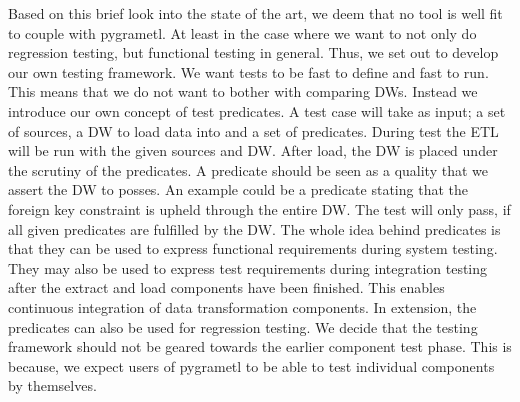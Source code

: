 Based on this brief look into the state of the art, we deem that no tool is well fit to couple with pygrametl. At least in the case where we want to not only do regression testing, but functional testing in general. Thus, we set out to develop our own testing framework. We want tests to be fast to define and fast to run. This means that we do not want to bother with comparing DWs. Instead we introduce our own concept of test predicates. A test case will take as input; a set of sources, a DW to load data into and a set of predicates. During test the ETL will be run with the given sources and DW. After load, the DW  is placed under the scrutiny of the predicates. A predicate should be seen as a quality that we assert the DW to posses. An example could be a predicate stating that the foreign key constraint is upheld through the entire DW. The test will only pass, if all given predicates are fulfilled by the DW. The whole idea behind predicates is that they can be used to express functional requirements during system testing. They may also be used to express test requirements during integration testing after the extract and load components have been finished. This enables continuous integration of data transformation components. In extension, the predicates can also be used for regression testing. We decide that the testing framework should not be geared towards the earlier component test phase. This is because, we expect users of pygrametl to be able to test individual components by themselves. 
 


